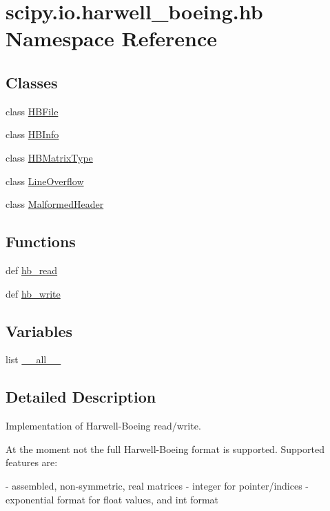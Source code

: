\hypertarget{namespacescipy_1_1io_1_1harwell__boeing_1_1hb}{}\section{scipy.\+io.\+harwell\+\_\+boeing.\+hb Namespace Reference}
\label{namespacescipy_1_1io_1_1harwell__boeing_1_1hb}
\subsection*{Classes}
\begin{DoxyCompactItemize}
\item 
class \hyperlink{classscipy_1_1io_1_1harwell__boeing_1_1hb_1_1HBFile}{H\+B\+File}
\item 
class \hyperlink{classscipy_1_1io_1_1harwell__boeing_1_1hb_1_1HBInfo}{H\+B\+Info}
\item 
class \hyperlink{classscipy_1_1io_1_1harwell__boeing_1_1hb_1_1HBMatrixType}{H\+B\+Matrix\+Type}
\item 
class \hyperlink{classscipy_1_1io_1_1harwell__boeing_1_1hb_1_1LineOverflow}{Line\+Overflow}
\item 
class \hyperlink{classscipy_1_1io_1_1harwell__boeing_1_1hb_1_1MalformedHeader}{Malformed\+Header}
\end{DoxyCompactItemize}
\subsection*{Functions}
\begin{DoxyCompactItemize}
\item 
def \hyperlink{namespacescipy_1_1io_1_1harwell__boeing_1_1hb_aad0d5b9be381fc6be6c9ea2c1b776bb5}{hb\+\_\+read}
\item 
def \hyperlink{namespacescipy_1_1io_1_1harwell__boeing_1_1hb_a8630612e16d8fe7c14a76433b3d5938a}{hb\+\_\+write}
\end{DoxyCompactItemize}
\subsection*{Variables}
\begin{DoxyCompactItemize}
\item 
list \hyperlink{namespacescipy_1_1io_1_1harwell__boeing_1_1hb_a858acb43c10fc019d17f1ca9438ded91}{\+\_\+\+\_\+all\+\_\+\+\_\+}
\end{DoxyCompactItemize}


\subsection{Detailed Description}
\begin{DoxyVerb}Implementation of Harwell-Boeing read/write.

At the moment not the full Harwell-Boeing format is supported. Supported
features are:

    - assembled, non-symmetric, real matrices
    - integer for pointer/indices
    - exponential format for float values, and int format\end{DoxyVerb}
 


